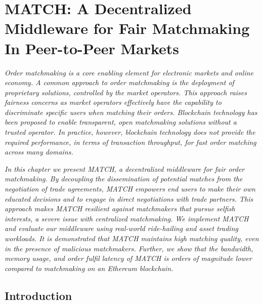 \chapter{MATCH: A Decentralized Middleware for Fair Matchmaking In Peer-to-Peer Markets}
\label{chapter:match}

\emph{
	Order matchmaking is a core enabling element for electronic markets and online economy.
	A common approach to order matchmaking is the deployment of proprietary solutions, controlled by the market operators.
	This approach raises fairness concerns as market operators effectively have the capability to discriminate specific users when matching their orders.
	Blockchain technology has been proposed to enable transparent, open matchmaking solutions without a trusted operator.
	In practice, however, blockchain technology does not provide the required performance, in terms of transaction throughput, for fast order matching across many domains. }
	
\emph{
	In this chapter we present MATCH, a decentralized middleware for fair order matchmaking.
	By decoupling the dissemination of potential matches from the negotiation of trade agreements, MATCH empowers end users to make their own educated decisions and to engage in direct negotiations with trade partners.
	This approach makes MATCH resilient against matchmakers that pursue selfish interests, a severe issue with centralized matchmaking.
	We implement MATCH and evaluate our middleware using real-world ride-hailing and asset trading workloads.
	It is demonstrated that MATCH maintains high matching quality, even in the presence of malicious matchmakers.
	Further, we show that the bandwidth, memory usage, and order fulfil latency of MATCH is orders of magnitude lower compared to matchmaking on an Ethereum blockchain. }

\newpage

\section{Introduction}
\label{sec:introduction}

